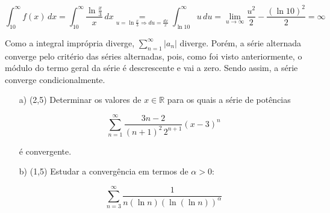 \documentclass[12pt,a4paper]{article}
\begin{document}
\begin{itemize}
    $$ \int_{10}^\infty f(x) \, dx = \int_{10}^\infty \frac{\ln \frac{x}{3}}{x}  \, dx \underset{u = \ln \frac{x}{3} \Rightarrow du = \frac{dx}{x} }{=} \int_{\ln 10}^\infty u  \, du = \lim_{u\rightarrow\infty} \frac{u^2}{2} - \frac{(\ln 10)^2}{2} = \infty $$
    
    Como a integral imprópria diverge, $\displaystyle\sum_{n=1}^\infty |a_n|$ diverge. Porém, a série alternada converge pelo critério das séries alternadas, pois, como foi visto anteriormente, o módulo do termo geral da série é descrescente e vai a zero. Sendo assim, a série converge condicionalmente.

\end{itemize}


\newpage
{}
\begin{itemize}
\item[a)] (2,5) Determinar os valores de $x \in \mathbb{R}$ para os quais a série de potências

$$ \sum_{n=1}^\infty \frac{3n-2}{(n+1)^2 \, 2^{n+1}} (x-3)^n $$

é convergente.

\item[b)] (1,5) Estudar a convergência em termos de $\alpha > 0$:

$$ \sum_{n=3}^\infty \frac{1}{n (\ln n)(\ln (\ln n))^\alpha} $$

\end{itemize}


\\
\end{document}
